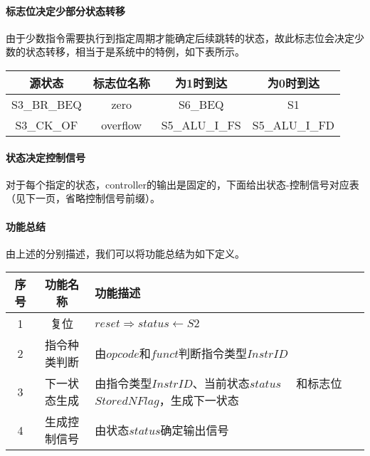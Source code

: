 \documentclass[main.tex]{subfiles}
\begin{document}
\paragraph{标志位决定少部分状态转移}
由于少数指令需要执行到指定周期才能确定后续跳转的状态，故此标志位会决定少数的状态转移，相当于是系统中的特例，如下表所示。

\begin{center}
    \begin{tabular}{cccc}
        \toprule
        源状态 & 标志位名称 & 为1时到达 & 为0时到达 \\
        \midrule
            S3\_BR\_BEQ & zero & S6\_BEQ & S1 \\
            S3\_CK\_OF & overflow & S5\_ALU\_I\_FS & S5\_ALU\_I\_FD \\
        \bottomrule
    \end{tabular}
\end{center}

\paragraph{状态决定控制信号}
对于每个指定的状态，controller的输出是固定的，下面给出状态-控制信号对应表（见下一页，省略控制信号前缀）。

\paragraph{功能总结}
由上述的分别描述，我们可以将功能总结为如下定义。

\begin{center}
    \begin{tabular}{c c l}
        \toprule
        序号 & 功能名称 & 功能描述 \\
        \midrule
        1 & 复位 &  $reset \Rightarrow status \leftarrow S2$\\
        2 & 指令种类判断 &  由$opcode$和$funct$判断指令类型$InstrID$\\
        3 & 下一状态生成 &  \makecell[lt]{
                             由指令类型$InstrID$、当前状态$status$\\
                             \ \ 和标志位$StoredNFlag$，生成下一状态
                            }\\
        4 & 生成控制信号 &  由状态$status$确定输出信号 \\
        \bottomrule
    \end{tabular}
\end{center}
\end{document}
